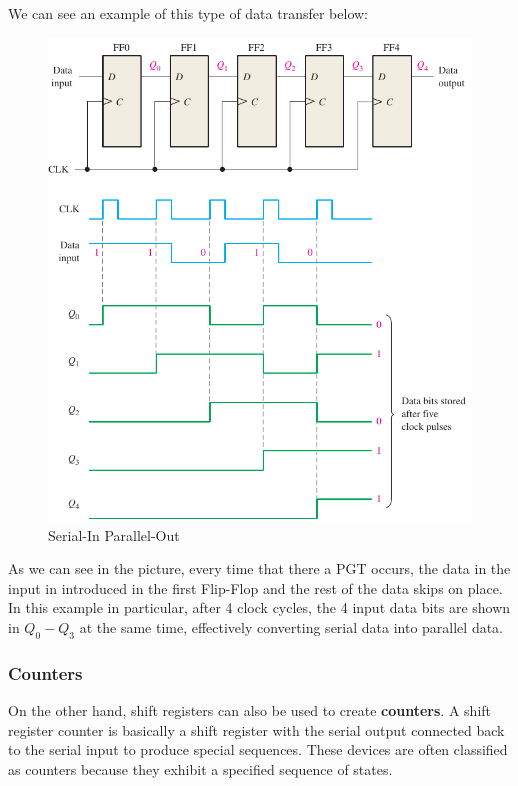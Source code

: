 \clearpage

We can see an example of this type of data transfer below:

\begin{figure}[H]
    \centering
    \includegraphics[]{Graphics/Practice 5/SHIFT_REGISTER_BASICS/DATA_TRANSMISSION/SIPO_and_Wave.pdf}
    \caption{Serial-In Parallel-Out ~\autocite{FLOYD}}
    \label{fig:SIPO}
\end{figure}

As we can see in the picture, every time that there a PGT occurs, the data in the input in introduced in the first Flip-Flop and the rest of the data skips on place. In this example in particular, after 4 clock cycles, the 4 input data bits are shown in $Q_0 - Q_3$ at the same time, effectively converting serial data into parallel data.\medskip

\clearpage

\subsubsection{Counters}
\label{sec:COUNTERS}

On the other hand, shift registers can also be used to create \textbf{counters}. A shift register counter is basically a shift register with the serial output connected back to the serial input to produce special sequences. These devices are often classified as counters because they exhibit a specified sequence of states.\medskip 

